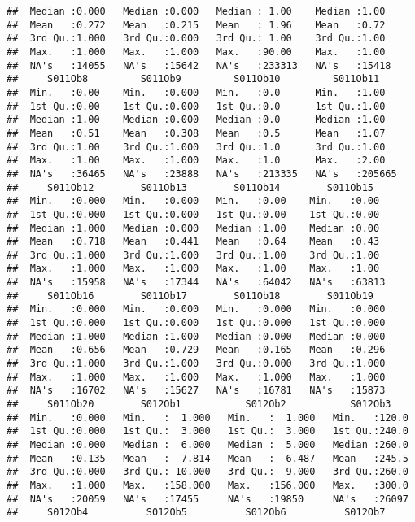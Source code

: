 \documentclass[
]{article}
\begin{document}
\begin{verbatim}
##  Median :0.000   Median :0.000   Median : 1.00    Median :1.00   
##  Mean   :0.272   Mean   :0.215   Mean   : 1.96    Mean   :0.72   
##  3rd Qu.:1.000   3rd Qu.:0.000   3rd Qu.: 1.00    3rd Qu.:1.00   
##  Max.   :1.000   Max.   :1.000   Max.   :90.00    Max.   :1.00   
##  NA's   :14055   NA's   :15642   NA's   :233313   NA's   :15418  
##     S011Ob8         S011Ob9         S011Ob10         S011Ob11     
##  Min.   :0.00    Min.   :0.000   Min.   :0.0      Min.   :1.00    
##  1st Qu.:0.00    1st Qu.:0.000   1st Qu.:0.0      1st Qu.:1.00    
##  Median :1.00    Median :0.000   Median :0.0      Median :1.00    
##  Mean   :0.51    Mean   :0.308   Mean   :0.5      Mean   :1.07    
##  3rd Qu.:1.00    3rd Qu.:1.000   3rd Qu.:1.0      3rd Qu.:1.00    
##  Max.   :1.00    Max.   :1.000   Max.   :1.0      Max.   :2.00    
##  NA's   :36465   NA's   :23888   NA's   :213335   NA's   :205665  
##     S011Ob12        S011Ob13        S011Ob14        S011Ob15    
##  Min.   :0.000   Min.   :0.000   Min.   :0.00    Min.   :0.00   
##  1st Qu.:0.000   1st Qu.:0.000   1st Qu.:0.00    1st Qu.:0.00   
##  Median :1.000   Median :0.000   Median :1.00    Median :0.00   
##  Mean   :0.718   Mean   :0.441   Mean   :0.64    Mean   :0.43   
##  3rd Qu.:1.000   3rd Qu.:1.000   3rd Qu.:1.00    3rd Qu.:1.00   
##  Max.   :1.000   Max.   :1.000   Max.   :1.00    Max.   :1.00   
##  NA's   :15958   NA's   :17344   NA's   :64042   NA's   :63813  
##     S011Ob16        S011Ob17        S011Ob18        S011Ob19    
##  Min.   :0.000   Min.   :0.000   Min.   :0.000   Min.   :0.000  
##  1st Qu.:0.000   1st Qu.:0.000   1st Qu.:0.000   1st Qu.:0.000  
##  Median :1.000   Median :1.000   Median :0.000   Median :0.000  
##  Mean   :0.656   Mean   :0.729   Mean   :0.165   Mean   :0.296  
##  3rd Qu.:1.000   3rd Qu.:1.000   3rd Qu.:0.000   3rd Qu.:1.000  
##  Max.   :1.000   Max.   :1.000   Max.   :1.000   Max.   :1.000  
##  NA's   :16702   NA's   :15627   NA's   :16781   NA's   :15873  
##     S011Ob20        S012Ob1           S012Ob2           S012Ob3     
##  Min.   :0.000   Min.   :  1.000   Min.   :  1.000   Min.   :120.0  
##  1st Qu.:0.000   1st Qu.:  3.000   1st Qu.:  3.000   1st Qu.:240.0  
##  Median :0.000   Median :  6.000   Median :  5.000   Median :260.0  
##  Mean   :0.135   Mean   :  7.814   Mean   :  6.487   Mean   :245.5  
##  3rd Qu.:0.000   3rd Qu.: 10.000   3rd Qu.:  9.000   3rd Qu.:260.0  
##  Max.   :1.000   Max.   :158.000   Max.   :156.000   Max.   :300.0  
##  NA's   :20059   NA's   :17455     NA's   :19850     NA's   :26097  
##     S012Ob4          S012Ob5          S012Ob6          S012Ob7      

\end{verbatim}
\end{document}
